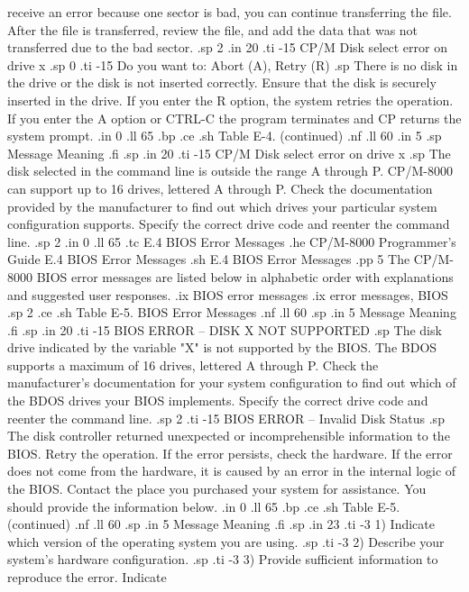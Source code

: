receive an error because one sector is bad, you can continue 
transferring the file.  After the file is transferred, review 
the file, and add the data that was not transferred due to the 
bad sector.
.sp 2
.in 20
.ti -15
CP/M Disk select error on drive x
.sp 0
.ti -15
Do you want to:   Abort (A), Retry (R)
.sp
There is no disk in the drive or the disk is not 
inserted correctly.  Ensure that the disk is
securely inserted in the drive.  If you enter the R option, the system 
retries the operation.  If you enter the A option or CTRL-C
the program terminates and CP returns the system prompt.
.in 0
.ll 65
.bp
.ce
.sh
Table E-4.  (continued)
.nf
.ll 60
.in 5
.sp
Message        Meaning
.fi
.sp
.in 20
.ti -15
CP/M Disk select error on drive x
.sp
The disk selected in the command line is outside the 
range A through P.  CP/M-8000 can support up to 16 drives, lettered A through 
P.  Check
the documentation provided by the manufacturer to find out which drives your
particular system configuration supports.  Specify the
correct drive code and reenter the command line.
.sp 2
.in 0
.ll 65
.tc    E.4  BIOS Error Messages
.he CP/M-8000 Programmer's Guide              E.4  BIOS Error Messages
.sh
E.4  BIOS Error Messages
.pp 5
The CP/M-8000 BIOS error messages are listed below in alphabetic order
with explanations and
suggested user responses.
.ix BIOS error messages
.ix error messages, BIOS
.sp 2
.ce
.sh
Table E-5.  BIOS Error Messages
.nf
.ll 60
.sp
.in 5
Message        Meaning
.fi
.sp
.in 20
.ti -15
BIOS ERROR -- DISK X NOT SUPPORTED
.sp
The disk drive indicated by the variable "X" is not supported by
the BIOS.  The BDOS supports a maximum of 16 drives, lettered A through
P.  Check the manufacturer's documentation for your system configuration to 
find out which of the BDOS drives your BIOS implements.  Specify the
correct drive code and reenter the command line.
.sp 2
.ti -15
BIOS ERROR -- Invalid Disk Status
.sp
The disk controller returned unexpected or 
incomprehensible information to the BIOS.  Retry the operation.  If the error 
persists, 
check the hardware.  If the error
does not come from the hardware, it is caused by an error in the internal 
logic of the BIOS.  Contact the place you purchased your 
system for assistance.  
You should provide the information below.
.in 0
.ll 65
.bp
.ce
.sh
Table E-5.  (continued)
.nf
.ll 60
.sp
.in 5
Message        Meaning
.fi
.sp
.in 23
.ti -3
1) Indicate which version of the operating system you are using.
.sp
.ti -3
2) Describe your system's hardware configuration.
.sp
.ti -3
3) Provide sufficient information to reproduce the error.  Indicate 
